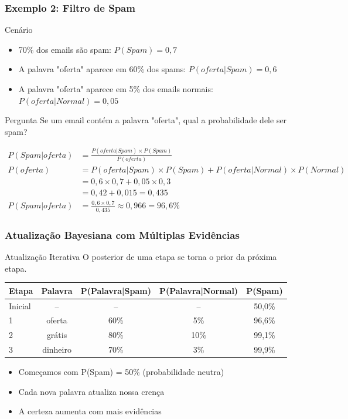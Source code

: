 \documentclass[11pt]{beamer}
\begin{document}
\begin{frame}
\frametitle{Exemplo 2: Filtro de Spam}
\begin{block}{Cenário}
\begin{itemize}
\item 70\% dos emails são spam: $P(Spam) = 0,7$
\item A palavra "oferta" aparece em 60\% dos spams: $P(oferta|Spam) = 0,6$
\item A palavra "oferta" aparece em 5\% dos emails normais: $P(oferta|Normal) = 0,05$
\end{itemize}
\end{block}

\begin{alertblock}{Pergunta}
Se um email contém a palavra "oferta", qual a probabilidade dele ser spam?
\end{alertblock}

\begin{align*}
P(Spam|oferta) &= \frac{P(oferta|Spam) \times P(Spam)}{P(oferta)} \\[8pt]
P(oferta) &= P(oferta|Spam) \times P(Spam) + P(oferta|Normal) \times P(Normal) \\
&= 0,6 \times 0,7 + 0,05 \times 0,3 \\
&= 0,42 + 0,015 = 0,435 \\[8pt]
P(Spam|oferta) &= \frac{0,6 \times 0,7}{0,435} \approx 0,966 = 96,6\%
\end{align*}
\end{frame}

\begin{frame}
\frametitle{Atualização Bayesiana com Múltiplas Evidências}
\begin{block}{Atualização Iterativa}
O posterior de uma etapa se torna o prior da próxima etapa.
\end{block}

\begin{center}
\footnotesize
\begin{tabular}{|l|c|c|c|c|}
\hline
\textbf{Etapa} & \textbf{Palavra} & \textbf{P(Palavra|Spam)} & \textbf{P(Palavra|Normal)} & \textbf{P(Spam)} \\
\hline
Inicial & -- & -- & -- & 50,0\% \\
\hline
1 & oferta & 60\% & 5\% & 96,6\% \\
\hline
2 & grátis & 80\% & 10\% & 99,1\% \\
\hline
3 & dinheiro & 70\% & 3\% & 99,9\% \\
\hline
\end{tabular}
\end{center}

\begin{itemize}
\item Começamos com P(Spam) = 50\% (probabilidade neutra)
\item Cada nova palavra atualiza nossa crença
\item A certeza aumenta com mais evidências
\end{itemize}
\end{frame}
\end{document}
